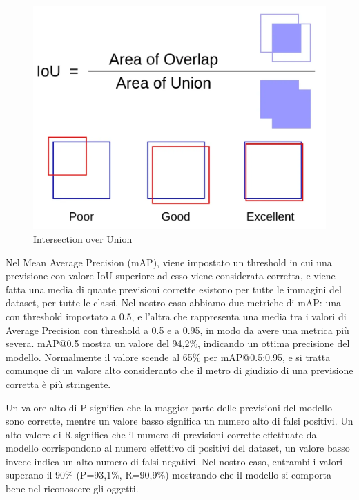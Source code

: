\documentclass{article}
\begin{document}
  \begin{figure}[h!]
    \centering
    \includegraphics[width=0.35\linewidth]{iou.png}
    \caption{Intersection over Union}
  \end{figure}
  
  \newpage

  Nel Mean Average Precision (mAP), viene impostato un threshold in cui una previsione con valore IoU superiore ad esso viene considerata corretta, e viene fatta una media di quante previsioni corrette esistono per tutte le immagini del dataset, per tutte le classi.
  Nel nostro caso abbiamo due metriche di mAP: una con threshold impostato a 0.5, e l'altra che rappresenta una media tra i valori di Average Precision con threshold a 0.5 e a 0.95, in modo da avere una metrica più severa.
  mAP@0.5 mostra un valore del 94,2\%, indicando un ottima precisione del modello. Normalmente il valore scende al 65\% per mAP@0.5:0.95, e si tratta comunque di un valore alto consideranto che il metro di giudizio di una previsione corretta è più stringente.

  Un valore alto di P significa che la maggior parte delle previsioni del modello sono corrette, mentre un valore basso significa un numero alto di falsi positivi.
  Un alto valore di R significa che il numero di previsioni corrette effettuate dal modello corrispondono al numero effettivo di positivi del dataset, un valore basso invece indica un alto numero di falsi negativi.
  Nel nostro caso, entrambi i valori superano il 90\% (P=93,1\%, R=90,9\%) mostrando che il modello si comporta bene nel riconoscere gli oggetti.
\end{document}
